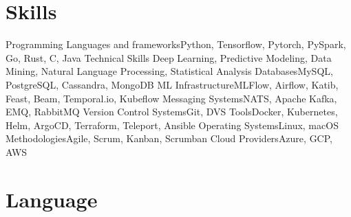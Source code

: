 \section{Skills}

\cvline%
{Programming Languages and frameworks}{Python, Tensorflow, Pytorch, PySpark, Go, Rust, C, Java}
\cvline%
{Technical Skills} {Deep Learning, Predictive Modeling, Data Mining, Natural Language Processing, Statistical Analysis}
\cvline%
{Databases}{MySQL, PostgreSQL, Cassandra, MongoDB}
\cvline%
{ML Infrastructure}{MLFlow, Airflow, Katib, Feast, Beam, Temporal.io, Kubeflow}
\cvline%
{Messaging Systems}{NATS, Apache Kafka, EMQ, RabbitMQ}
\cvline%
{Version Control Systems}{Git, DVS}
\cvline%
{Tools}{Docker, Kubernetes, Helm, ArgoCD, Terraform, Teleport, Ansible}
\cvline%
{Operating Systems}{Linux, macOS}
\cvline%
{Methodologies}{Agile, Scrum, Kanban, Scrumban}
\cvline%
{Cloud Providers}{Azure, GCP, AWS}

\section{Language}


\emptysection{}\closesection{}
